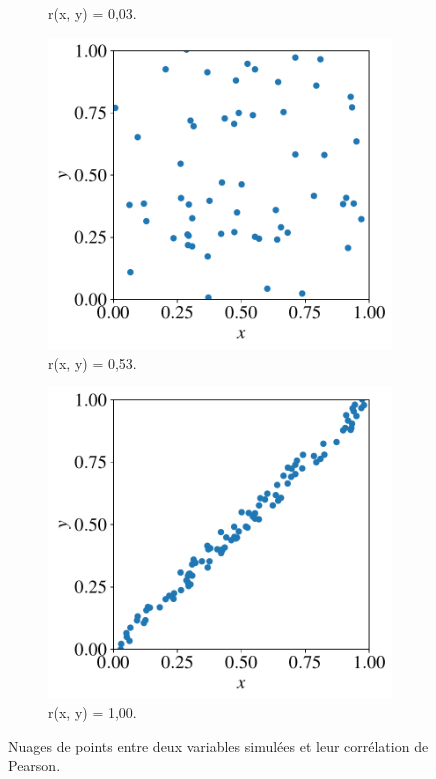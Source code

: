 \begin{figure}[h]
\begin{subfigure}[t]{0.24\textwidth}
      \caption{r(x, y) = 0,03.}
    \end{subfigure} \hfill
    \begin{subfigure}[t]{0.24\textwidth}
      \centering
      \includegraphics[width=\textwidth]{figures/stats/pearson_2}
      \caption{r(x, y) = 0,53.}
    \end{subfigure} \hfill
    \begin{subfigure}[t]{0.24\textwidth}
      \centering
      \includegraphics[width=\textwidth]{figures/stats/pearson_1}
      \caption{r(x, y) = 1,00.}
    \end{subfigure} \hfill
  \caption{Nuages de points entre deux variables simulées et leur corrélation de Pearson.}
  \label{fig:pearson}
\end{figure}

